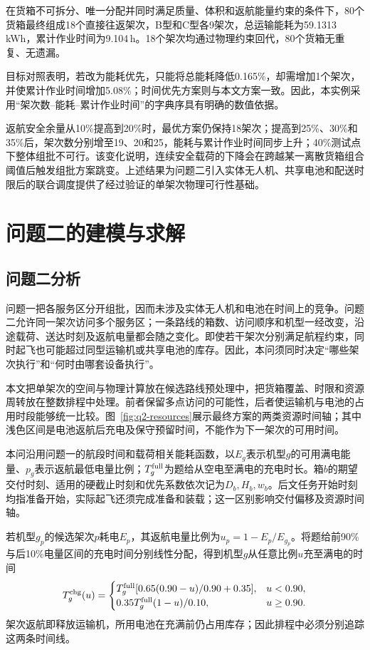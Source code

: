 \documentclass[bwprint,fontset=fandol]{gmcmthesis}
\begin{document}
在货箱不可拆分、唯一分配并同时满足质量、体积和返航能量约束的条件下，80个货箱最终组成18个直接往返架次，B型和C型各9架次，总运输能耗为59.1313\,kWh，累计作业时间为9.104\,h。18个架次均通过物理约束回代，80个货箱无重复、无遗漏。

目标对照表明，若改为能耗优先，只能将总能耗降低0.165\%，却需增加1个架次，并使累计作业时间增加5.08\%；时间优先方案则与本文方案一致。因此，本实例采用“架次数--能耗--累计作业时间”的字典序具有明确的数值依据。

返航安全余量从10\%提高到20\%时，最优方案仍保持18架次；提高到25\%、30\%和35\%后，架次数分别增至19、20和25，能耗与累计作业时间同步上升；40\%测试点下整体组批不可行。该变化说明，连续安全载荷的下降会在跨越某一离散货箱组合阈值后触发组批方案跳变。上述结果为问题二引入实体无人机、共享电池和配送时限后的联合调度提供了经过验证的单架次物理可行性基础。

\FloatBarrier

\section{问题二的建模与求解}
\subsection{问题二分析}
问题一把各服务区分开组批，因而未涉及实体无人机和电池在时间上的竞争。问题二允许同一架次访问多个服务区；一条路线的箱数、访问顺序和机型一经改变，沿途载荷、送达时刻及返航电量都会随之变化。即使若干架次分别满足航程约束，同时起飞也可能超过同型运输机或共享电池的库存。因此，本问须同时决定“哪些架次执行”和“何时由哪套设备执行”。

本文把单架次的空间与物理计算放在候选路线预处理中，把货箱覆盖、时限和资源周转放在整数排程中处理。前者保留多点访问的可能性，后者使运输机与电池的占用时段能够统一比较。图~\ref{fig:q2-resources}展示最终方案的两类资源时间轴；其中浅色区间是电池返航后充电及保守预留时间，不能作为下一架次的可用时间。

本问沿用问题一的航段时间和载荷相关能耗函数，以$E_g$表示机型$g$的可用满电能量、$p_g$表示返航最低电量比例；$T_g^{\rm full}$为题给从空电至满电的充电时长。箱$b$的期望交付时刻、适用的硬截止时刻和优先系数依次记为$D_b,H_b,w_b$。后文任务开始时刻均指准备开始，实际起飞还须完成准备和装载；这一区别影响交付偏移及资源时间轴。

若机型$g_p$的候选架次$p$耗电$E_p$，其返航电量比例为$u_p=1-E_p/E_{g_p}$。将题给前90\%与后10\%电量区间的充电时间分别线性分配，得到机型$g$从任意比例$u$充至满电的时间
\begin{equation}
T_g^{\rm chg}(u)=
\begin{cases}
T_g^{\rm full}[0.65(0.90-u)/0.90+0.35],&u<0.90,\\
0.35T_g^{\rm full}(1-u)/0.10,&u\geq0.90.
\end{cases}
\label{eq:q2-charge}
\end{equation}
架次返航即释放运输机，所用电池在充满前仍占用库存；因此排程中必须分别追踪这两条时间线。
\end{document}
